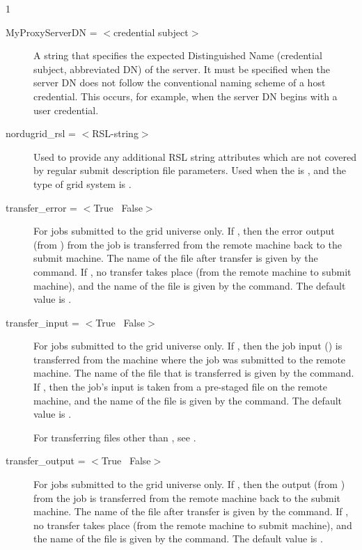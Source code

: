 \begin{ManPage}{\label{man-condor-submit}}{1}
\begin{description}

\item[MyProxyServerDN = $<$credential subject$>$]
A string that specifies the expected Distinguished Name (credential subject,
abbreviated DN)
of the  server.
It must be specified when the  server
DN does not follow the
conventional naming scheme of a host credential.
This occurs, for
example, when the   server DN begins with a user credential.



\item[nordugrid\_rsl = $<$RSL-string$>$]
Used to provide any additional RSL
string attributes which are not covered by regular submit description
file parameters. Used when the  is ,
and the type of grid system is .


\item[transfer\_error = $<$True \Bar\ False$>$]
For jobs submitted to the grid universe only.
If , then the error output (from ) from the job
is transferred from the remote machine back to the submit machine.
The name of the file after transfer is given
by the  command.
If , no transfer takes place (from the remote machine
to submit machine),
and the name of the file is given
by the  command.
The default value is .

\item[transfer\_input = $<$True \Bar\ False$>$]
For jobs submitted to the grid universe only.
If , then the job input () is transferred
from the machine where the job was submitted to the remote machine.
The name of the file that is transferred is given by the
 command.
If , then the job's input is taken from a pre-staged
file on the remote machine, and
the name of the file is given by the  command.
The default value is .

For transferring files other than ,
see .

\item[transfer\_output = $<$True \Bar\ False$>$]
For jobs submitted to the grid universe only.
If , then the output (from ) from the job
is transferred from the remote machine back to the submit machine.
The name of the file after transfer is given
by the  command.
If , no transfer takes place (from the remote machine
to submit machine),
and the name of the file is given
by the  command.
The default value is .


\end{description}
\end{ManPage}
